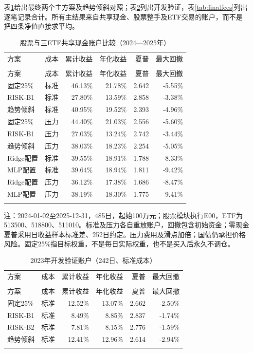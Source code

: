 \documentclass[12pt]{article}
\newcommand{\toprule}{\noalign{\hrule height .8pt}}
\newcommand{\midrule}{\noalign{\hrule height .4pt}}
\newcommand{\bottomrule}{\noalign{\hrule height .8pt}}
\begin{document}
表\ref{tab:finalmain}给出最终两个主方案及趋势倾斜对照；表\ref{tab:finalvalidation}列出开发验证，表\ref{tab:finalfees}列出逐笔记录合计。所有主结果来自共享现金、股票整手及ETF交易的账户，而不是把四条净值直接求平均。
{\small
\begin{longtable}{@{}lrrrrr@{}}
\caption{股票与三ETF共享现金账户比较（2024—2025年）}\label{tab:finalmain}\\
\toprule
方案 & 成本 & 累计收益 & 年化收益 & 夏普 & 最大回撤 \\
\midrule\endfirsthead
\multicolumn{6}{c}{表\thetable（续）}\\\toprule
方案 & 成本 & 累计收益 & 年化收益 & 夏普 & 最大回撤 \\
\midrule\endhead
固定25\% & 标准 & 46.13\% & 21.78\% & 2.642 & -5.55\% \\
RISK-B1 & 标准 & 27.80\% & 13.59\% & 2.858 & -3.38\% \\
趋势倾斜 & 标准 & 40.95\% & 19.52\% & 2.393 & -4.96\% \\
固定25\% & 压力 & 44.40\% & 21.03\% & 2.556 & -5.60\% \\
RISK-B1 & 压力 & 27.03\% & 13.24\% & 2.742 & -3.44\% \\
趋势倾斜 & 压力 & 38.03\% & 18.23\% & 2.254 & -5.05\% \\
Ridge配置 & 标准 & 39.55\% & 18.91\% & 1.788 & -8.33\% \\
MLP配置 & 标准 & 39.64\% & 18.94\% & 1.811 & -9.42\% \\
Ridge配置 & 压力 & 36.12\% & 17.38\% & 1.686 & -8.47\% \\
MLP配置 & 压力 & 38.19\% & 18.30\% & 1.775 & -9.41\% \\
\bottomrule\end{longtable}}
{\footnotesize\noindent 注：2024-01-02至2025-12-31，485日，起始100万元；股票模块执行E00，ETF为513500、518800、511010。标准及压力各自重放账户，回撤包含初始资金；零现金夏普采用日收益样本标准差、252日约定。压力费用及滑点加倍；国债仍承担价格风险。固定25\%指目标权重，不是每日实际权重，也不是买入后永久不调仓。\par}
{\small
\begin{longtable}{@{}lrrrrr@{}}
\caption{2023年开发验证账户（242日、标准成本）}\label{tab:finalvalidation}\\
\toprule
方案 & 成本 & 累计收益 & 年化收益 & 夏普 & 最大回撤 \\
\midrule\endfirsthead
\multicolumn{6}{c}{表\thetable（续）}\\\toprule
方案 & 成本 & 累计收益 & 年化收益 & 夏普 & 最大回撤 \\
\midrule\endhead
固定25\% & 标准 & 12.52\% & 13.07\% & 2.662 & -2.50\% \\
RISK-B1 & 标准 & 8.49\% & 8.85\% & 2.837 & -1.74\% \\
RISK-B2 & 标准 & 7.81\% & 8.15\% & 2.776 & -1.59\% \\
趋势倾斜 & 标准 & 12.41\% & 12.96\% & 2.614 & -2.94\% \\
\bottomrule\end{longtable}}
\end{document}
